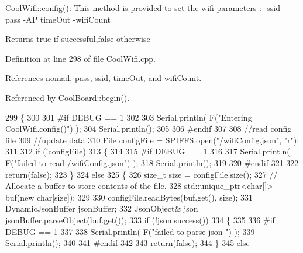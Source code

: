 \hyperlink{classCoolWifi_a4eb2f6b9b09dd588964b88b6c70122c0}{Cool\+Wifi\+::config()}\+: This method is provided to set the wifi parameters \+: -\/ssid -\/pass -\/\+AP time\+Out -\/wifi\+Count

\begin{DoxyReturn}{Returns}
true if successful,false otherwise 
\end{DoxyReturn}


Definition at line 298 of file Cool\+Wifi.\+cpp.



References nomad, pass, ssid, time\+Out, and wifi\+Count.



Referenced by Cool\+Board\+::begin().


\begin{DoxyCode}
299 \{
300 
301 \textcolor{preprocessor}{#if DEBUG == 1 }
302 
303     Serial.println( F(\textcolor{stringliteral}{"Entering CoolWifi.config()"}) );
304     Serial.println();
305 
306 \textcolor{preprocessor}{#endif}
307 
308     \textcolor{comment}{//read config file}
309     \textcolor{comment}{//update data}
310     File configFile = SPIFFS.open(\textcolor{stringliteral}{"/wifiConfig.json"}, \textcolor{stringliteral}{"r"});
311 
312     \textcolor{keywordflow}{if} (!configFile) 
313     \{
314     
315 \textcolor{preprocessor}{    #if DEBUG == 1 }
316 
317         Serial.println( F(\textcolor{stringliteral}{"failed to read /wifiConfig.json"}) );
318         Serial.println();
319 
320 \textcolor{preprocessor}{    #endif}
321 
322         \textcolor{keywordflow}{return}(\textcolor{keyword}{false});
323     \}
324     \textcolor{keywordflow}{else}
325     \{
326         \textcolor{keywordtype}{size\_t} size = configFile.size();
327         \textcolor{comment}{// Allocate a buffer to store contents of the file.}
328         std::unique\_ptr<char[]> buf(\textcolor{keyword}{new} \textcolor{keywordtype}{char}[size]);
329 
330         configFile.readBytes(buf.get(), size);
331         DynamicJsonBuffer jsonBuffer;
332         JsonObject& json = jsonBuffer.parseObject(buf.get());
333         \textcolor{keywordflow}{if} (!json.success()) 
334         \{
335         
336 \textcolor{preprocessor}{        #if DEBUG == 1 }
337 
338             Serial.println( F(\textcolor{stringliteral}{"failed to parse json "}) );
339             Serial.println();
340         
341 \textcolor{preprocessor}{        #endif}
342             
343             \textcolor{keywordflow}{return}(\textcolor{keyword}{false});
344         \} 
345         \textcolor{keywordflow}{else}

\end{DoxyCode}

